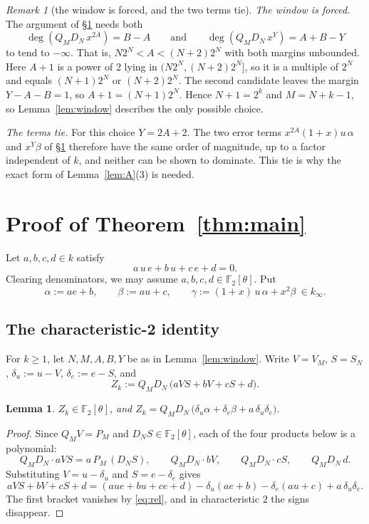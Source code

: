 \documentclass[11pt]{amsart}
\newtheorem{lemma}[theorem]{Lemma}
\theoremstyle{remark}
\newtheorem{remark}[theorem]{Remark}
\numberwithin{equation}{section}
\newcommand{\F}{\mathbb{F}}
\newcommand{\kinf}{k_\infty}
\begin{document}
\begin{remark}[the window is forced, and the two terms tie]\label{rem:window}
\emph{The window is forced.} The argument of \S\ref{sec:proof} needs both
\[
\deg(Q_MD_N\,x^{2A})=B-A\qquad\text{and}\qquad\deg(Q_MD_N\,x^{Y})=A+B-Y
\]
to tend to $-\infty$. That is, $N2^N<A<(N+2)2^N$ with both margins unbounded. Here $A+1$ is a power of $2$ lying in $(N2^N,(N+2)2^N]$, so it is a multiple of $2^N$ and equals $(N+1)2^N$ or $(N+2)2^N$. The second candidate leaves the margin $Y-A-B=1$, so $A+1=(N+1)2^N$. Hence $N+1=2^k$ and $M=N+k-1$, so Lemma~\ref{lem:window} describes the only possible choice.

\emph{The terms tie.} For this choice $Y=2A+2$. The two error terms $x^{2A}(1+x)u\,\alpha$ and $x^Y\beta$ of \S\ref{sec:proof} therefore have the same order of magnitude, up to a factor independent of $k$, and neither can be shown to dominate. This tie is why the exact form of Lemma~\ref{lem:A}(3) is needed.
\end{remark}

\section{Proof of \texorpdfstring{Theorem~\ref{thm:main}}{the main theorem}}\label{sec:proof}

Let $a,b,c,d\in k$ satisfy
\begin{equation}\label{eq:rel}
a\,u\,e+b\,u+c\,e+d=0 .
\end{equation}
Clearing denominators, we may assume $a,b,c,d\in\F_2[\theta]$. Put
\[
\alpha:=ae+b,\qquad\beta:=au+c,\qquad\gamma:=(1+x)\,u\,\alpha+x^2\beta\ \in\kinf .
\]

\subsection{The characteristic-2 identity}
For $k\ge1$, let $N,M,A,B,Y$ be as in Lemma~\ref{lem:window}. Write $V=V_M$, $S=S_N$, $\delta_u:=u-V$, $\delta_e:=e-S$, and
\[
Z_k:=Q_MD_N\,\bigl(aVS+bV+cS+d\bigr).
\]

\begin{lemma}\label{lem:identity}
$Z_k\in\F_2[\theta]$, and $Z_k=Q_MD_N\,\bigl(\delta_u\alpha+\delta_e\beta+a\,\delta_u\delta_e\bigr)$.
\end{lemma}

\begin{proof}
Since $Q_MV=P_M$ and $D_NS\in\F_2[\theta]$, each of the four products below is a polynomial:
\[
Q_MD_N\cdot aVS=a\,P_M\,(D_NS),\qquad Q_MD_N\cdot bV,\qquad Q_MD_N\cdot cS,\qquad Q_MD_N\,d .
\]
Substituting $V=u-\delta_u$ and $S=e-\delta_e$ gives
\[
aVS+bV+cS+d=(aue+bu+ce+d)-\delta_u(ae+b)-\delta_e(au+c)+a\,\delta_u\delta_e .
\]
The first bracket vanishes by \eqref{eq:rel}, and in characteristic $2$ the signs disappear.
\end{proof}
\end{document}
